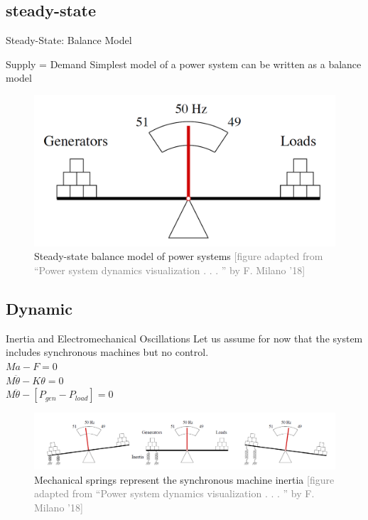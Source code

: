 \documentclass{beamer}
\begin{document}
\subsection{steady-state}
\begin{frame}{Steady-State: Balance Model}
\begin{block}{Supply = Demand}
Simplest model of a power system can be written as a balance model 
\end{block}
        \begin{figure}
        \includegraphics[scale=0.35]{Figures/steadystate.PNG}
        \caption{Steady-state balance model of power systems  \textcolor{gray}{\tiny [figure adapted from “Power system dynamics visualization . . . ” by F. Milano ’18]}}
        \end{figure}

\end{frame}

\subsection{Dynamic}
\begin{frame}
\begin{block}{Inertia and Electromechanical Oscillations}
Let us assume for now that the system includes synchronous machines but no control.\\
\centering  $Ma-F=0$\\
\centering $M\ddot{\theta}-K\theta=0$\\
\centering $M\ddot{\theta}-[P_{gen}-P_{load}]=0$
\end{block}
        \begin{figure}
        \includegraphics[scale=0.35]{Figures/SystemInertia1.PNG}
        \caption{Mechanical springs represent the synchronous machine inertia \textcolor{gray}{\tiny [figure adapted from “Power system dynamics visualization . . . ” by F. Milano ’18]}}
        \end{figure}

\end{frame}
\end{document}
